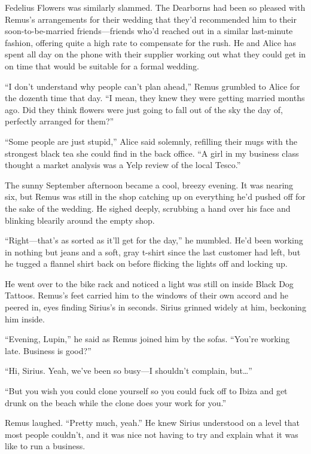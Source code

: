 Fedelius Flowers was similarly slammed. The Dearborns had been so pleased with Remus’s arrangements for their wedding that they’d recommended him to their soon-to-be-married friends—friends who’d reached out in a similar last-minute fashion, offering quite a high rate to compensate for the rush. He and Alice has spent all day on the phone with their supplier working out what they could get in on time that would be suitable for a formal wedding.

“I don’t understand why people can’t plan ahead,” Remus grumbled to Alice for the dozenth time that day. “I mean, they knew they were getting married months ago. Did they think flowers were just going to fall out of the sky the day of, perfectly arranged for them?”

“Some people are just stupid,” Alice said solemnly, refilling their mugs with the strongest black tea she could find in the back office. “A girl in my business class thought a market analysis was a Yelp review of the local Tesco.”

The sunny September afternoon became a cool, breezy evening. It was nearing six, but Remus was still in the shop catching up on everything he’d pushed off for the sake of the wedding. He sighed deeply, scrubbing a hand over his face and blinking blearily around the empty shop.

“Right—that’s as sorted as it’ll get for the day,” he mumbled. He’d been working in nothing but jeans and a soft, gray t-shirt since the last customer had left, but he tugged a flannel shirt back on before flicking the lights off and locking up.

He went over to the bike rack and noticed a light was still on inside Black Dog Tattoos. Remus’s feet carried him to the windows of their own accord and he peered in, eyes finding Sirius’s in seconds. Sirius grinned widely at him, beckoning him inside.

“Evening, Lupin,” he said as Remus joined him by the sofas. “You’re working late. Business is good?”

“Hi, Sirius. Yeah, we’ve been so busy—I shouldn’t complain, but…”

“But you wish you could clone yourself so you could fuck off to Ibiza and get drunk on the beach while the clone does your work for you.”

Remus laughed. “Pretty much, yeah.” He knew Sirius understood on a level that most people couldn’t, and it was nice not having to try and explain what it was like to run a business.

